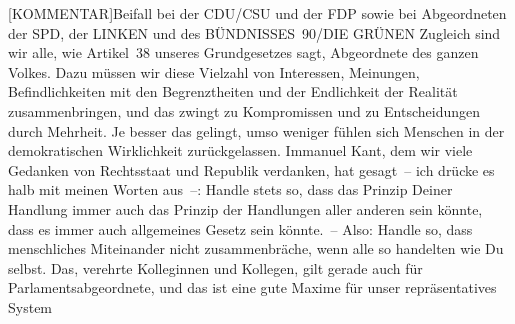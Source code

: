\documentclass[a4paper,11pt]{article}
\begin{document}
[KOMMENTAR]Beifall bei der CDU/CSU und der FDP sowie bei Abgeordneten der SPD, der LINKEN und des BÜNDNISSES 90/DIE GRÜNEN
 Zugleich sind wir alle, wie Artikel 38 unseres Grundgesetzes sagt, Abgeordnete des ganzen Volkes. Dazu müssen wir diese Vielzahl von Interessen, Meinungen, Befindlichkeiten mit den Begrenztheiten und der Endlichkeit der Realität zusammenbringen, und das zwingt zu Kompromissen und zu Entscheidungen durch Mehrheit. Je besser das gelingt, umso weniger fühlen sich Menschen in der demokratischen Wirklichkeit zurückgelassen. Immanuel Kant, dem wir viele Gedanken von Rechtsstaat und Republik verdanken, hat gesagt – ich drücke es halb mit meinen Worten aus –: Handle stets so, dass das Prinzip Deiner Handlung immer auch das Prinzip der Handlungen aller anderen sein könnte, dass es immer auch allgemeines Gesetz sein könnte. – Also: Handle so, dass menschliches Miteinander nicht zusammenbräche, wenn alle so handelten wie Du selbst. Das, verehrte Kolleginnen und Kollegen, gilt gerade auch für Parlamentsabgeordnete, und das ist eine gute Maxime für unser repräsentatives System
\end{document}
